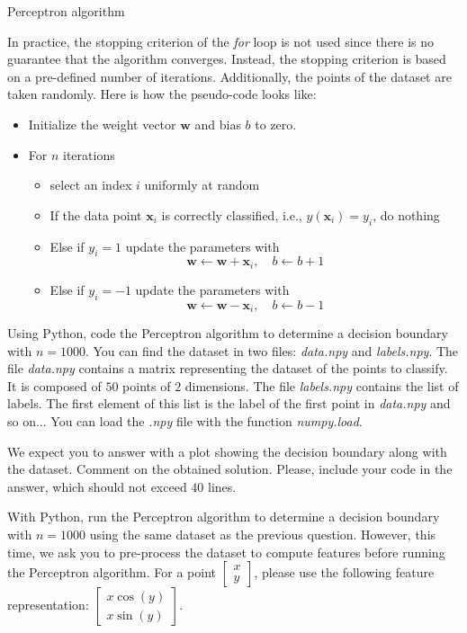\documentclass[
	ngerman,
	points=true,%
    solution=true,
    accentcolor=9c,
    colorbacktitle
	]{tudaexercise}
\begin{document}
\begin{task}{Perceptron algorithm}
\begin{subtask}
In practice, the stopping criterion of the \textit{for} loop is not used since there is no guarantee that the algorithm converges. Instead, the stopping criterion is based on a pre-defined number of iterations. Additionally, the points of the dataset are taken randomly. Here is how the pseudo-code looks like:
\begin{itemize}
    \item Initialize the weight vector $\boldsymbol{w}$ and bias $b$ to zero.
    \item For $n$ iterations
    \begin{itemize}
        \item select an index $i$ uniformly at random
        \item If the data point $\boldsymbol{x}_{i}$ is correctly classified, i.e., $y\left(\boldsymbol{x}_{i}\right)=y_{i}$, do nothing
        \item Else if $y_{i}=1$ update the parameters with
        $$
        \boldsymbol{w}\leftarrow\boldsymbol{w}+\boldsymbol{x}_{i},\quad b\leftarrow b+1
        $$
        \item Else if $y_{i}=-1$ update the parameters with
        $$
        \boldsymbol{w}\leftarrow\boldsymbol{w}-\boldsymbol{x}_{i},\quad b\leftarrow b-1
        $$
    \end{itemize}
\end{itemize}

Using Python, code the Perceptron algorithm to determine a decision boundary with $n = 1000$. You can find the dataset in two files: \textit{data.npy} and \textit{labels.npy}. The file \textit{data.npy} contains a matrix representing the dataset of the points to classify. It is composed of $50$ points of $2$ dimensions. The file \textit{labels.npy} contains the list of labels. The first element of this list is the label of the first point in \textit{data.npy} and so on... You can load the \textit{.npy} file with the function \textit{numpy.load}.

We expect you to answer with a plot showing the decision boundary along with the dataset. Comment on the obtained solution. Please, include your code in the answer, which should not exceed $40$ lines.
\end{subtask}
\begin{solution}

\end{solution}

\begin{subtask}
With Python, run the Perceptron algorithm to determine a decision boundary with $n = 1000$ using the same dataset as the previous question. However, this time, we ask you to pre-process the dataset to compute features before running the Perceptron algorithm. For a point $\begin{bmatrix} x \\ y \end{bmatrix}$, please use the following feature representation: $\begin{bmatrix} x \cos(y) \\ x \sin(y) \end{bmatrix}$. 


\end{subtask}
\end{task}
\end{document}
